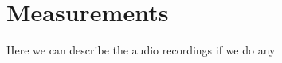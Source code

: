 \chapter{Measurements}\label{ch:measurements}

Here we can describe the audio recordings if we do any
